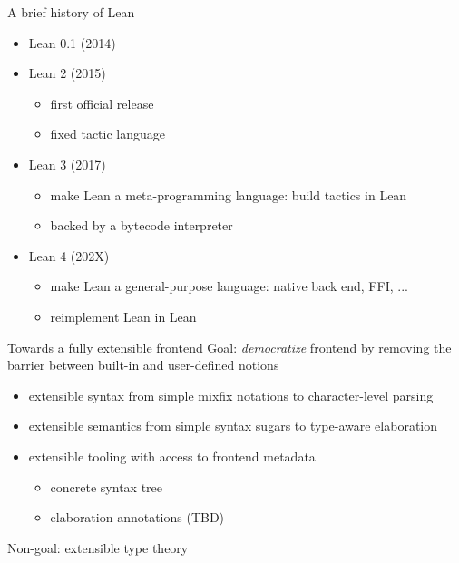 \documentclass[t]{beamer}
\newcommand{\kit}[1]{\textcolor{KITgreen}{#1}}
\begin{document}
\begin{frame}{A brief history of Lean}
  \begin{itemize}
  \item Lean 0.1 (2014)
  \item Lean 2 (2015)
    \begin{itemize}
    \item first official release
    \item fixed tactic language
    \end{itemize}
  \item Lean 3 (2017)
    \begin{itemize}
    \item make Lean a \kit{meta-programming} language: build tactics in Lean
    \item backed by a bytecode interpreter
    \end{itemize}
  \item Lean 4 (202X)
    \begin{itemize}
    \item make Lean a \kit{general-purpose} language: native back end, FFI, ...
    \item reimplement Lean in Lean
    \end{itemize}
  \end{itemize}
\end{frame}


\begin{frame}{Towards a fully extensible frontend}
  Goal: \emph{democratize} frontend by removing the barrier between built-in and user-defined notions
  \begin{itemize}
    \pause
  \item extensible syntax from simple mixfix notations to character-level parsing
    \pause
  \item extensible semantics from simple syntax sugars to type-aware elaboration
    \pause
  \item extensible tooling with access to frontend metadata
    \begin{itemize}
    \item concrete syntax tree
    \item elaboration annotations (TBD)
    \end{itemize}
  \end{itemize}
  \pause
  \bigskip
  Non-goal: extensible type theory
\end{frame}
\end{document}
